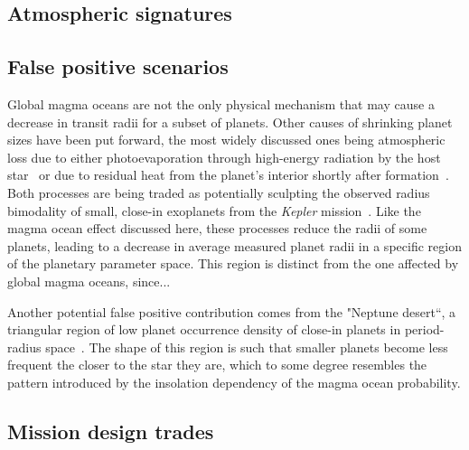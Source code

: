 \documentclass[modern]{aastex631}
\begin{document}
\subsection{Atmospheric signatures}

\subsection{False positive scenarios}
\begin{note}
Global magma oceans are not the only physical mechanism that may cause a decrease in transit radii for a subset of planets.
Other causes of shrinking planet sizes have been put forward, the most widely discussed ones being atmospheric loss due to either photoevaporation through high-energy radiation by the host star~\citep[e.g.,][]{Owen2013,Jin2014,Mordasini2020a} or due to residual heat from the planet's interior shortly after formation~\citep{Ginzburg2016b,Ginzburg2018,Gupta2019}.
    Both processes are being traded as potentially sculpting the observed radius bimodality of small, close-in exoplanets from the \textit{Kepler} mission~\citep{Fulton2017,VanEylen2018}.
    Like the magma ocean effect discussed here, these processes reduce the radii of some planets, leading to a decrease in average measured planet radii in a specific region of the planetary parameter space.
    This region is distinct from the one affected by global magma oceans, since... 

    Another potential false positive contribution comes from the "Neptune desert``, a triangular region of low planet occurrence density of close-in planets in period-radius space~\citep{Szabo2011,Mazeh2016,Dreizler2020b}.
    The shape of this region is such that smaller planets become less frequent the closer to the star they are, which to some degree resembles the pattern introduced by the insolation dependency of the magma ocean probability.
\end{note}

\subsection{Mission design trades}\label{sec:mission-design-trades}
\end{document}
